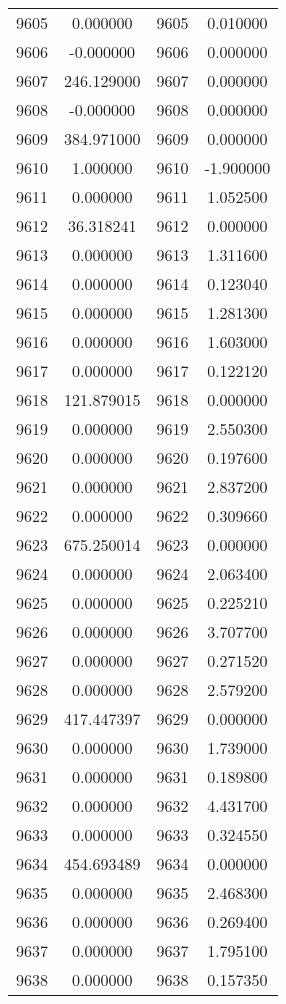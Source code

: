 \documentclass[12pt]{article}
\begin{document}
\begin{longtable}{@{}cccc@{}}
9605 & 0.000000 & 9605 & 0.010000 \\
9606 & -0.000000 & 9606 & 0.000000 \\
9607 & 246.129000 & 9607 & 0.000000 \\
9608 & -0.000000 & 9608 & 0.000000 \\
9609 & 384.971000 & 9609 & 0.000000 \\
9610 & 1.000000 & 9610 & -1.900000 \\
9611 & 0.000000 & 9611 & 1.052500 \\
9612 & 36.318241 & 9612 & 0.000000 \\
9613 & 0.000000 & 9613 & 1.311600 \\
9614 & 0.000000 & 9614 & 0.123040 \\
9615 & 0.000000 & 9615 & 1.281300 \\
9616 & 0.000000 & 9616 & 1.603000 \\
9617 & 0.000000 & 9617 & 0.122120 \\
9618 & 121.879015 & 9618 & 0.000000 \\
9619 & 0.000000 & 9619 & 2.550300 \\
9620 & 0.000000 & 9620 & 0.197600 \\
9621 & 0.000000 & 9621 & 2.837200 \\
9622 & 0.000000 & 9622 & 0.309660 \\
9623 & 675.250014 & 9623 & 0.000000 \\
9624 & 0.000000 & 9624 & 2.063400 \\
9625 & 0.000000 & 9625 & 0.225210 \\
9626 & 0.000000 & 9626 & 3.707700 \\
9627 & 0.000000 & 9627 & 0.271520 \\
9628 & 0.000000 & 9628 & 2.579200 \\
9629 & 417.447397 & 9629 & 0.000000 \\
9630 & 0.000000 & 9630 & 1.739000 \\
9631 & 0.000000 & 9631 & 0.189800 \\
9632 & 0.000000 & 9632 & 4.431700 \\
9633 & 0.000000 & 9633 & 0.324550 \\
9634 & 454.693489 & 9634 & 0.000000 \\
9635 & 0.000000 & 9635 & 2.468300 \\
9636 & 0.000000 & 9636 & 0.269400 \\
9637 & 0.000000 & 9637 & 1.795100 \\
9638 & 0.000000 & 9638 & 0.157350 \\

\end{longtable}
\end{document}
